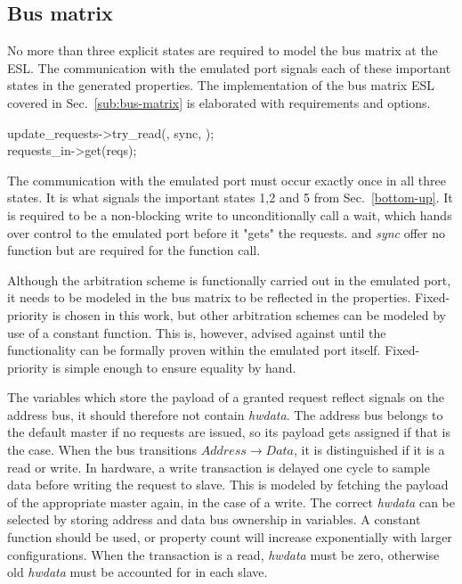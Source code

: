 \subsection{Bus matrix}
No more than three explicit states are required to model the bus matrix at the ESL. The communication with the emulated port signals each of these important states in the generated properties. The implementation of the bus matrix ESL covered in Sec.~\ref{sub:bus-matrix} is elaborated with requirements and options. \par
update\_requests->try\_read(, sync, );  \\
requests\_in->get(reqs); \par

The communication with the emulated port must occur exactly once in all three states. It is what signals the important states 1,2 and 5 from Sec.~\ref{bottom-up}. It is required to be a non-blocking write to unconditionally call a wait, which hands over control to the emulated port before it "gets" the requests.  and \textit{sync} offer no function but are required for the function call. \par
Although the arbitration scheme is functionally carried out in the emulated port, it needs to be modeled in the bus matrix to be reflected in the properties. Fixed-priority is chosen in this work, but other arbitration schemes can be modeled by use of a constant function. This is, however, advised against until the functionality can be formally proven within the emulated port itself. Fixed-priority is simple enough to ensure equality by hand. \par
The variables which store the payload of a granted request reflect signals on the address bus, it should therefore not contain \textit{hwdata}. The address bus belongs to the default master if no requests are issued, so its payload gets assigned if that is the case. When the bus transitions $Address\rightarrow Data$, it is distinguished if it is a read or write. In hardware, a write transaction is delayed one cycle to sample data before writing the request to slave. This is modeled by fetching the payload of the appropriate master again, in the case of a write. The correct \textit{hwdata} can be selected by storing address and data bus ownership in variables. A constant function should be used, or property count will increase exponentially with larger configurations. When the transaction is a read, \textit{hwdata} must be zero, otherwise old \textit{hwdata} must be accounted for in each slave. \par
